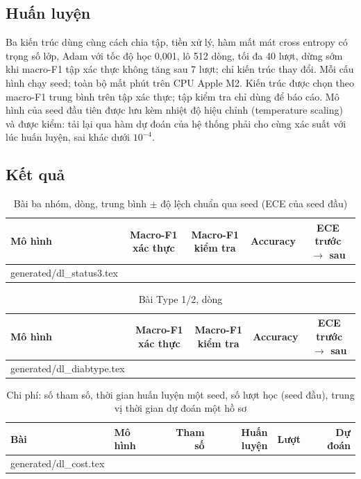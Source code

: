\documentclass[11pt,a4paper]{article}
\makeatletter
\newcommand{\tablerows}[1]{\@@input #1 }
\makeatother
\begin{document}
\subsection{Huấn luyện}

Ba kiến trúc dùng cùng cách chia tập, tiền xử lý, hàm mất mát cross entropy có trọng số lớp, Adam với tốc độ học 0,001, lô 512
dòng, tối đa 40 lượt, dừng sớm khi macro-F1 tập xác thực không tăng sau 7 lượt; chỉ kiến trúc thay đổi. Mỗi cấu hình chạy
\dlSeeds{} seed; toàn bộ mất \dlTotalMin{} phút trên CPU Apple M2. Kiến trúc được chọn theo macro-F1 trung bình trên tập xác
thực; tập kiểm tra chỉ dùng để báo cáo. Mô hình của seed đầu tiên được lưu kèm nhiệt độ hiệu chỉnh (temperature scaling) và
được kiểm: tải lại qua hàm dự đoán của hệ thống phải cho cùng xác suất với lúc huấn luyện, sai khác dưới $10^{-4}$.

\subsection{Kết quả}

\begin{table}[H]
\centering
\caption{Bài ba nhóm, \rowsStatus{} dòng, trung bình $\pm$ độ lệch chuẩn qua \dlSeeds{} seed (ECE của seed đầu)}
\begin{tabular}{lcccc}
\toprule
Mô hình & Macro-F1 xác thực & Macro-F1 kiểm tra & Accuracy & ECE trước $\to$ sau \\
\midrule
\tablerows{generated/dl_status3.tex}
\bottomrule
\end{tabular}
\end{table}

\begin{table}[H]
\centering
\caption{Bài Type 1/2, \rowsType{} dòng}
\begin{tabular}{lcccc}
\toprule
Mô hình & Macro-F1 xác thực & Macro-F1 kiểm tra & Accuracy & ECE trước $\to$ sau \\
\midrule
\tablerows{generated/dl_diabtype.tex}
\bottomrule
\end{tabular}
\end{table}

\begin{table}[H]
\centering
\caption{Chi phí: số tham số, thời gian huấn luyện một seed, số lượt học (seed đầu), trung vị thời gian dự đoán một hồ sơ}
\begin{tabular}{llrrrr}
\toprule
Bài & Mô hình & Tham số & Huấn luyện & Lượt & Dự đoán \\
\midrule
\tablerows{generated/dl_cost.tex}
\bottomrule
\end{tabular}
\end{table}
\end{document}
